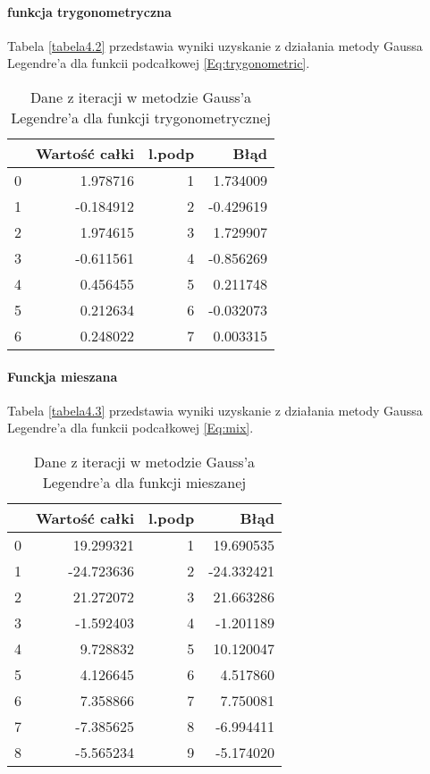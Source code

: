 \documentclass[12pt,twoside]{article}
\begin{document}
\paragraph{funkcja trygonometryczna}

Tabela \eqref{tabela4.2} przedstawia wyniki uzyskanie z działania metody Gaussa Legendre'a dla funkcii podcałkowej \eqref{Eq:trygonometric}.

\begin{table}[H]
\centering
\caption{Dane z iteracji w metodzie Gauss'a Legendre'a dla funkcji trygonometrycznej}
\label{tabela4.2}
\begin{tabular}{lrrr}
\toprule
{} &  Wartość całki &  l.podp &      Błąd \\
\midrule
0 &       1.978716 &       1 &  1.734009 \\
1 &      -0.184912 &       2 & -0.429619 \\
2 &       1.974615 &       3 &  1.729907 \\
3 &      -0.611561 &       4 & -0.856269 \\
4 &       0.456455 &       5 &  0.211748 \\
5 &       0.212634 &       6 & -0.032073 \\
6 &       0.248022 &       7 &  0.003315 \\
\bottomrule
\end{tabular}
\end{table}

\paragraph{Funckja mieszana}

Tabela \eqref{tabela4.3} przedstawia wyniki uzyskanie z działania metody Gaussa Legendre'a dla funkcii podcałkowej \eqref{Eq:mix}.


\begin{table}[H]
\centering
\caption{Dane z iteracji w metodzie Gauss'a Legendre'a dla funkcji mieszanej}
\label{tabela4.3}
\begin{tabular}{lrrr}
\toprule
{} &  Wartość całki &  l.podp &       Błąd \\
\midrule
0 &      19.299321 &       1 &  19.690535 \\
1 &     -24.723636 &       2 & -24.332421 \\
2 &      21.272072 &       3 &  21.663286 \\
3 &      -1.592403 &       4 &  -1.201189 \\
4 &       9.728832 &       5 &  10.120047 \\
5 &       4.126645 &       6 &   4.517860 \\
6 &       7.358866 &       7 &   7.750081 \\
7 &      -7.385625 &       8 &  -6.994411 \\
8 &      -5.565234 &       9 &  -5.174020 \\
\bottomrule
\end{tabular}
\end{table}
\end{document}
